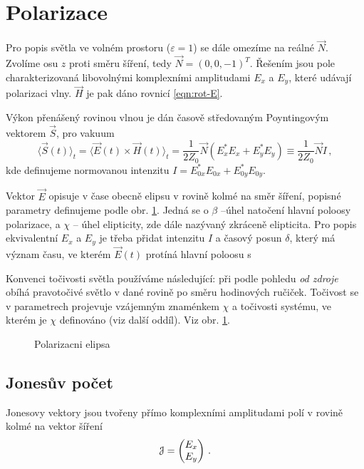 \section{Polarizace}
\label{chap:polarizace}

Pro popis světla ve volném prostoru ($\varepsilon=1$) se dále omezíme na reálné $\vec{N}$.
Zvolíme osu $z$ proti směru šíření, tedy $\vec{N}=(0,0,-1)^T$.
Řešením jsou pole charakterizovaná libovolnými komplexními amplitudami $E_x$ a $E_y$, které udávají polarizaci vlny.
$\vec{H}$ je pak dáno rovnicí \eqref{eqn:rot-E}.

Výkon přenášený rovinou vlnou je dán časově středovaným Poyntingovým vektorem $\vec{S}$, pro vakuum
\begin{equation} \label{eqn:Poynting}
    \langle \vec{S}(t)\rangle_t=\langle\vec{E}(t)\times\vec{H}(t)\rangle_t=\frac{1}{2 Z_0}\vec{N} \left( E_x^*E_x+E_y^*E_y \right)
    \equiv \frac{1}{2 Z_0}\vec{N} I\,,
\end{equation}
kde definujeme normovanou intenzitu $I=E_{0x}^*E_{0x}+E_{0y}^*E_{0y}$.

Vektor $\vec{E}$ opisuje v čase obecně elipsu v rovině kolmé na směr šíření, popisné parametry definujeme podle obr. \ref{fig:polarizacni-elipsa}.
Jedná se o $\beta$ --\tododash úhel natočení hlavní poloosy polarizace, a $\chi$ -- úhel elipticity, zde dále nazývaný zkráceně elipticita.
Pro popis ekvivalentní $E_x$ a $E_y$ je třeba přidat intenzitu $I$ a časový posun $\delta$, který má význam času, ve kterém $\vec{E}(t)$ protíná hlavní poloosu s

Konvenci točivosti světla používáme následující: při podle pohledu \emph{od zdroje} obíhá pravotočivé světlo v dané rovině po směru hodinových ručiček.
Točivost se v parametrech projevuje vzájemným znaménkem $\chi$ a točivosti systému, ve kterém je $\chi$ definováno (viz další oddíl).
Viz obr. \ref{fig:polarizacni-elipsa}.

\begin{figure}[htbp]
    \centering
    \caption{Polarizacni elipsa}
    \label{fig:polarizacni-elipsa}
\end{figure}

\subsection{Jonesův počet}
\label{chap:Jones}

Jonesovy vektory jsou tvořeny přímo komplexními amplitudami polí v rovině kolmé na vektor šíření
\begin{equation}
    \mathcal{J}=\begin{pmatrix} E_{x} \\ E_{y} \end{pmatrix} \,.
\end{equation}

